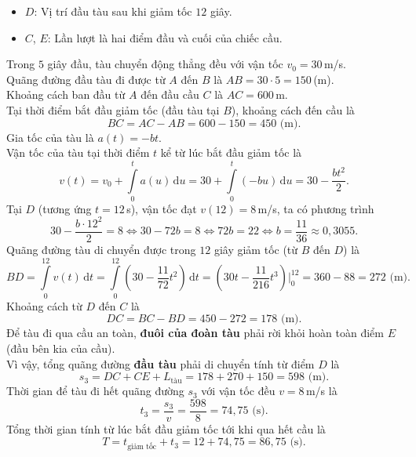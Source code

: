 \begin{ex}
{\begin{itemize}
			\item $D$: Vị trí đầu tàu sau khi giảm tốc $12$ giây.
			\item $C$, $E$: Lần lượt là hai điểm đầu và cuối của chiếc cầu.
		\end{itemize}
		\begin{itemchoice}
			\itemch 
			Trong $5$ giây đầu, tàu chuyển động thẳng đều với vận tốc $v_0 = 30$\,m/s.\\
			Quãng đường đầu tàu đi được từ $A$ đến $B$ là $AB = 30 \cdot 5 = 150$\,(m).\\
			Khoảng cách ban đầu từ $A$ đến đầu cầu $C$ là $AC = 600$\,m.\\
			Tại thời điểm bắt đầu giảm tốc (đầu tàu tại $B$), khoảng cách đến cầu là
			\[BC = AC - AB = 600 - 150 = 450 \text{ (m)}.\]
			\itemch 
			Gia tốc của tàu là $a(t) = -bt$.\\ Vận tốc của tàu tại thời điểm $t$ kể từ lúc bắt đầu giảm tốc là
			\[v(t) = v_0 + \displaystyle\int\limits_0^t a(u)\mathrm{\,d}u = 30 + \displaystyle\int\limits_0^t (-bu)\mathrm{\,d}u = 30 - \dfrac{bt^2}{2}.\]
			Tại $D$ (tương ứng $t = 12$\,s), vận tốc đạt $v(12) = 8$\,m/s, ta có phương trình
			\[30 - \dfrac{b \cdot 12^2}{2} = 8 \Leftrightarrow 30 - 72b = 8 \Leftrightarrow 72b = 22 \Leftrightarrow b = \dfrac{11}{36} \approx 0{,}3055.\]
			\itemch 
			Quãng đường tàu di chuyển được trong $12$ giây giảm tốc (từ $B$ đến $D$) là
			\[BD = \displaystyle\int\limits_0^{12} v(t) \mathrm{\,d}t = \displaystyle\int\limits_0^{12} \left( 30 - \dfrac{11}{72}t^2 \right) \mathrm{\,d}t = \left( 30t - \dfrac{11}{216}t^3 \right) \Bigg|_0^{12} = 360 - 88 = 272 \text{ (m)}.\]
			Khoảng cách từ $D$ đến $C$ là
			\[DC = BC - BD = 450 - 272 = 178 \text{ (m)}.\]
			\itemch 
			Để tàu đi qua cầu an toàn, \textbf{đuôi của đoàn tàu} phải rời khỏi hoàn toàn điểm $E$ (đầu bên kia của cầu).\\
			Vì vậy, tổng quãng đường \textbf{đầu tàu} phải di chuyển tính từ điểm $D$ là
			\[s_3 = DC + CE + L_{\text{tàu}} = 178 + 270 + 150 = 598 \text{ (m)}.\]
			Thời gian để tàu đi hết quãng đường $s_3$ với vận tốc đều $v = 8$\,m/s là
			\[t_3 = \dfrac{s_3}{v} = \dfrac{598}{8} = 74{,}75 \text{ (s)}.\]
			Tổng thời gian tính từ lúc bắt đầu giảm tốc tới khi qua hết cầu là
			\[T = t_{\text{giảm tốc}} + t_3 = 12 + 74{,}75 = 86{,}75 \text{ (s)}.\]
		\end{itemchoice}
	}
\end{ex}

